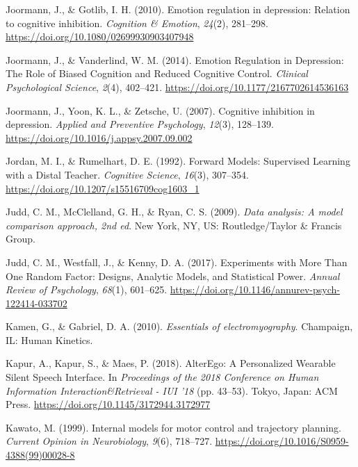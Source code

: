 \documentclass[a4paper,12pt,twoside,openright,oldfontcommands]{memoir}
\begin{document}
\leavevmode\hypertarget{ref-joormann_emotion_2010}{}%
Joormann, J., \& Gotlib, I. H. (2010). Emotion regulation in depression: Relation to cognitive inhibition. \emph{Cognition \& Emotion}, \emph{24}(2), 281--298. \url{https://doi.org/10.1080/02699930903407948}

\leavevmode\hypertarget{ref-joormann_emotion_2014}{}%
Joormann, J., \& Vanderlind, W. M. (2014). Emotion Regulation in Depression: The Role of Biased Cognition and Reduced Cognitive Control. \emph{Clinical Psychological Science}, \emph{2}(4), 402--421. \url{https://doi.org/10.1177/2167702614536163}

\leavevmode\hypertarget{ref-joormann_cognitive_2007}{}%
Joormann, J., Yoon, K. L., \& Zetsche, U. (2007). Cognitive inhibition in depression. \emph{Applied and Preventive Psychology}, \emph{12}(3), 128--139. \url{https://doi.org/10.1016/j.appsy.2007.09.002}

\leavevmode\hypertarget{ref-jordan_forward_1992}{}%
Jordan, M. I., \& Rumelhart, D. E. (1992). Forward Models: Supervised Learning with a Distal Teacher. \emph{Cognitive Science}, \emph{16}(3), 307--354. \url{https://doi.org/10.1207/s15516709cog1603_1}

\leavevmode\hypertarget{ref-judd_data_2009}{}%
Judd, C. M., McClelland, G. H., \& Ryan, C. S. (2009). \emph{Data analysis: A model comparison approach, 2nd ed}. New York, NY, US: Routledge/Taylor \& Francis Group.

\leavevmode\hypertarget{ref-judd_experiments_2017}{}%
Judd, C. M., Westfall, J., \& Kenny, D. A. (2017). Experiments with More Than One Random Factor: Designs, Analytic Models, and Statistical Power. \emph{Annual Review of Psychology}, \emph{68}(1), 601--625. \url{https://doi.org/10.1146/annurev-psych-122414-033702}

\leavevmode\hypertarget{ref-kamen_essentials_2010}{}%
Kamen, G., \& Gabriel, D. A. (2010). \emph{Essentials of electromyography}. Champaign, IL: Human Kinetics.

\leavevmode\hypertarget{ref-kapur_alterego_2018}{}%
Kapur, A., Kapur, S., \& Maes, P. (2018). AlterEgo: A Personalized Wearable Silent Speech Interface. In \emph{Proceedings of the 2018 Conference on Human Information Interaction\&Retrieval - IUI '18} (pp. 43--53). Tokyo, Japan: ACM Press. \url{https://doi.org/10.1145/3172944.3172977}

\leavevmode\hypertarget{ref-kawato_internal_1999}{}%
Kawato, M. (1999). Internal models for motor control and trajectory planning. \emph{Current Opinion in Neurobiology}, \emph{9}(6), 718--727. \url{https://doi.org/10.1016/S0959-4388(99)00028-8}
\end{document}
